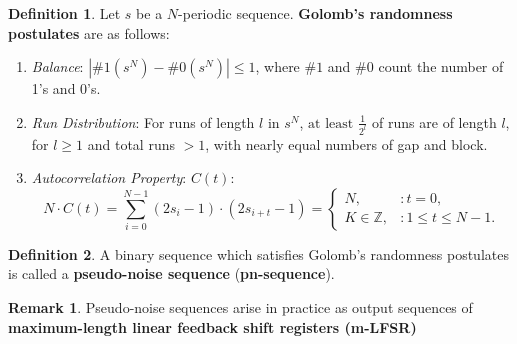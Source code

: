 \documentclass[12pt,openany]{book}
\theoremstyle{definition}
\newtheorem{definition}{Definition}[chapter]
\newtheorem{remark}{Remark}[chapter]
\newcommand{\Z}{\mathbb{Z}}
\begin{document}
	\begin{tcolorbox}[colback=white,colframe=defcolor,arc=5pt,title={\color{white}\bf Golomb's Randomness Postulates}]
		\begin{definition}
				Let \( s \) be a $N$-periodic sequence. \textbf{Golomb's randomness postulates} are as follows:
			\begin{enumerate}[\textbf{R}1]
				\item \textit{Balance}: \( \left| \#1(s^N) - \#0(s^N) \right| \leq 1 \), where \( \#1 \) and \( \#0 \) count the number of 1’s and 0’s.
				\item \textit{Run Distribution}: For runs of length \( l \) in \( s^N \), \( \text{at least } \frac{1}{2^l} \) of runs are of length \( l \), for \( l \geq 1 \) and total runs \( > 1 \), with nearly equal numbers of gap and block.
				\item \textit{Autocorrelation Property}: \( C(t) \): 
				\[
				N \cdot C(t)=\sum_{i=0}^{N-1}(2s_i - 1) \cdot (2s_{i+t} - 1)=
				\begin{cases} 
					N, & : t = 0, \\
					K\in\Z, & : 1 \leq t \leq N - 1.
				\end{cases}
				\]
			\end{enumerate}
		\end{definition}
	\end{tcolorbox}
	
	\begin{tcolorbox}[colback=white,colframe=defcolor,arc=5pt,title={\color{white}\bf \textbf{Pseudo-Noise Sequence} (\textbf{pn-sequence})}]
		\begin{definition}
			A binary sequence which satisfies Golomb's randomness postulates is called a \textbf{pseudo-noise sequence} (\textbf{pn-sequence}).
		\end{definition}
	\end{tcolorbox}
	\begin{remark}
		Pseudo-noise sequences arise in practice as output sequences of \textbf{maximum-length linear feedback shift registers (m-LFSR)}
	\end{remark}
	
\end{document}
